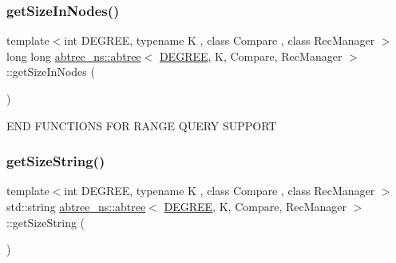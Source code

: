 \subsubsection{\texorpdfstring{get\+Size\+In\+Nodes()}{getSizeInNodes()}\hspace{0.1cm}{\footnotesize\ttfamily [2/2]}}
{\footnotesize\ttfamily template$<$int D\+E\+G\+R\+EE, typename K , class Compare , class Rec\+Manager $>$ \\
long long \hyperlink{classabtree__ns_1_1abtree}{abtree\+\_\+ns\+::abtree}$<$ \hyperlink{brown__sigouin__abtree__kcas_2adapter_8h_a5d88b17d70c985f2f2b8e987037fd6dd}{D\+E\+G\+R\+EE}, K, Compare, Rec\+Manager $>$\+::get\+Size\+In\+Nodes (\begin{DoxyParamCaption}{ }\end{DoxyParamCaption})\hspace{0.3cm}{\ttfamily [inline]}}

E\+ND F\+U\+N\+C\+T\+I\+O\+NS F\+OR R\+A\+N\+GE Q\+U\+E\+RY S\+U\+P\+P\+O\+RT \mbox{\label{classabtree__ns_1_1abtree_a2d3de27451d8f4ace50883760b88b37c}} 
\subsubsection{\texorpdfstring{get\+Size\+String()}{getSizeString()}\hspace{0.1cm}{\footnotesize\ttfamily [1/2]}}
{\footnotesize\ttfamily template$<$int D\+E\+G\+R\+EE, typename K , class Compare , class Rec\+Manager $>$ \\
std\+::string \hyperlink{classabtree__ns_1_1abtree}{abtree\+\_\+ns\+::abtree}$<$ \hyperlink{brown__sigouin__abtree__kcas_2adapter_8h_a5d88b17d70c985f2f2b8e987037fd6dd}{D\+E\+G\+R\+EE}, K, Compare, Rec\+Manager $>$\+::get\+Size\+String (\begin{DoxyParamCaption}{ }\end{DoxyParamCaption})\hspace{0.3cm}{\ttfamily [inline]}}

\mbox{\label{classabtree__ns_1_1abtree_a2d3de27451d8f4ace50883760b88b37c}} 
